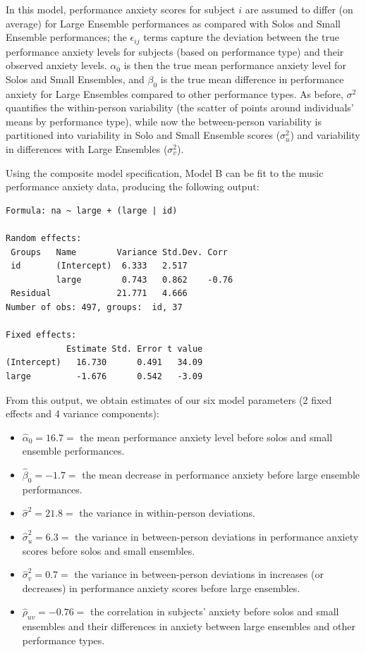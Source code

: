 \documentclass[
]{krantz}
\providecommand{\tightlist}{%
  \setlength{\itemsep}{0pt}\setlength{\parskip}{0pt}}
\begin{document}
In this model, performance anxiety scores for subject \(i\) are assumed to differ (on average) for Large Ensemble performances as compared with Solos and Small Ensemble performances; the \(\epsilon_{ij}\) terms capture the deviation between the true performance anxiety levels for subjects (based on performance type) and their observed anxiety levels. \(\alpha_{0}\) is then the true mean performance anxiety level for Solos and Small Ensembles, and \(\beta_{0}\) is the true mean difference in performance anxiety for Large Ensembles compared to other performance types. As before, \(\sigma^2\) quantifies the within-person variability (the scatter of points around individuals' means by performance type), while now the between-person variability is partitioned into variability in Solo and Small Ensemble scores (\(\sigma_{u}^{2}\)) and variability in differences with Large Ensembles (\(\sigma_{v}^{2}\)).

Using the composite model specification, Model B can be fit to the music performance anxiety data, producing the following output:

\begin{verbatim}
Formula: na ~ large + (large | id)

Random effects:
 Groups   Name        Variance Std.Dev. Corr 
 id       (Intercept)  6.333   2.517         
          large        0.743   0.862    -0.76
 Residual             21.771   4.666         
Number of obs: 497, groups:  id, 37

Fixed effects:
            Estimate Std. Error t value
(Intercept)   16.730      0.491   34.09
large         -1.676      0.542   -3.09
\end{verbatim}

From this output, we obtain estimates of our six model parameters (2 fixed effects and 4 variance components):

\begin{itemize}
\tightlist
\item
  \(\hat{\alpha}_{0}=16.7=\) the mean performance anxiety level before solos and small ensemble performances.
\item
  \(\hat{\beta}_{0}=-1.7=\) the mean decrease in performance anxiety before large ensemble performances.
\item
  \(\hat{\sigma}^2=21.8=\) the variance in within-person deviations.
\item
  \(\hat{\sigma}_{u}^{2}=6.3=\) the variance in between-person deviations in performance anxiety scores before solos and small ensembles.
\item
  \(\hat{\sigma}_{v}^{2}=0.7=\) the variance in between-person deviations in increases (or decreases) in performance anxiety scores before large ensembles.
\item
  \(\hat{\rho}_{uv}=-0.76=\) the correlation in subjects' anxiety before solos and small ensembles and their differences in anxiety between large ensembles and other performance types.
\end{itemize}
\end{document}
